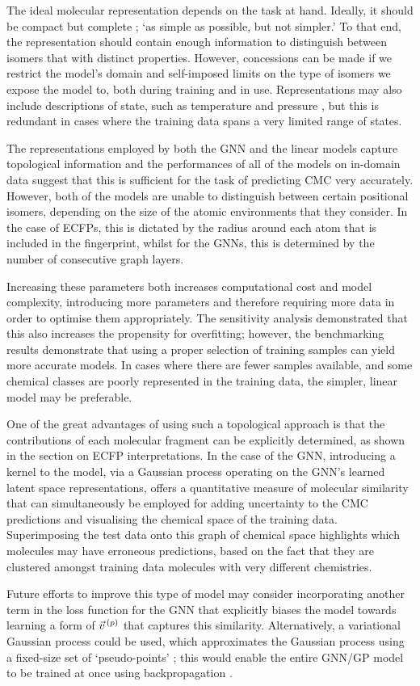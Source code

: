 The ideal molecular
representation depends on the task at hand. Ideally, it should be compact but
complete
\cite{faberCrystalStructureRepresentations2015,himanenDScribeLibraryDescriptors2020};
`as simple as possible, but not simpler.' To that end, the representation should
contain enough information to distinguish between isomers that with distinct
properties. However, concessions can be made if we restrict the model's domain
and self-imposed limits on the type of isomers we expose the model to, both
during training and in use. Representations may also include descriptions of
state, such as temperature and pressure \cite{chenGraphNetworksUniversal2019},
but this is redundant in cases where the training data spans a very limited
range of states.

The representations employed by both the GNN and the linear models capture
topological information and the performances of all of the models on in-domain
data suggest that this is sufficient for the task of predicting CMC very
accurately. However, both of the models are unable to distinguish between
certain positional isomers, depending on the size of the atomic environments
that they consider. In the case of ECFPs, this is dictated by the radius around
each atom that is included in the fingerprint, whilst for the GNNs, this is
determined by the number of consecutive graph layers.

Increasing these parameters both increases computational cost and model
complexity, introducing more parameters and therefore requiring more data in
order to optimise them appropriately. The sensitivity analysis demonstrated that
this also increases the propensity for overfitting; however, the benchmarking
results demonstrate that using a proper selection of training samples can yield
more accurate models. In cases where there are fewer samples available, and some
chemical classes are poorly represented in the training data, the simpler,
linear model may be preferable.

One of the great advantages of using such a topological approach is that the
contributions of each molecular fragment can be explicitly determined, as shown
in the section on ECFP interpretations. In the case of the GNN, introducing a
kernel to the model, via a Gaussian process operating on the GNN's learned
latent space representations, offers a quantitative measure of molecular
similarity that can simultaneously be employed for adding uncertainty to the CMC
predictions and visualising the chemical space of the training data.
Superimposing the test data onto this graph of chemical space highlights which
molecules may have erroneous predictions, based on the fact that they are
clustered amongst training data molecules with very different chemistries.

Future efforts to improve this type of model may consider incorporating another
term in the loss function for the GNN that explicitly biases the model towards
learning a form of $\vec{v}^{\,(p)}{}$ that captures this similarity. Alternatively, a
variational Gaussian process could be used, which approximates the Gaussian
process using a fixed-size set of `pseudo-points'
\cite{hensmanGaussianProcessesBig2013a}; this would enable the entire GNN/GP
model to be trained at once using backpropagation
\cite{moriartyUnlockNNUncertaintyQuantification2022}.